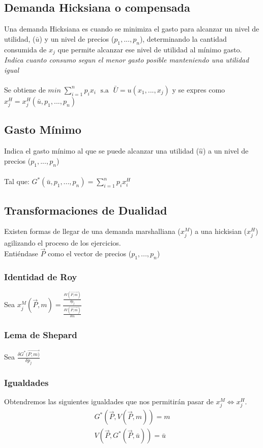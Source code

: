 \documentclass{article}
\begin{document}
\subsection{Demanda Hicksiana o compensada}
Una demanda Hicksiana es cuando se minimiza el gasto para alcanzar un nivel de utilidad, ($\bar{u}$) y un nivel de precios ($p_1,...,p_n$), determinando la cantidad consumida de $x_j$ que permite alcanzar ese nivel de utilidad al mínimo gasto. \\
\textit{Indica cuanto consumo segun el menor gasto posible manteniendo una utilidad igual}\\\\
Se obtiene de $min\; \sum_{i=1}^np_ix_i \;\text{ s.a }\; \bar{U}=u(x_1,...,x_j)$ y se expres como $x_j^H=x_j^H(\bar{u},p_1,...,p_n)$
\subsection{Gasto Mínimo}
Indica el gasto mínimo al que se puede alcanzar una utilidad ($\hat{u}$) a un nivel de precios ($p_1,...,p_n$)\\\\ 
Tal que: $G^*(\bar{u},p_1,...,p_n)=\sum_{i=1}^np_ix_i^H$\\ 
\subsection{Transformaciones de Dualidad}
Existen formas de llegar de una demanda marshalliana ($x_j^M$) a una hickisian ($x_j^H$) agilizando el proceso de los ejercicios. \\
Entiéndase $\vec{P}$ como el vector de precios ($p_1,...,p_n$)\\
\subsubsection{Identidad de Roy}
Sea $x_j^M(\vec{P},m)=\frac{\frac{\delta V(\vec{P,m})}{\delta p_j}}{\frac{\delta V(\vec{P,m})}{\delta m }}$\\
\subsubsection{Lema de Shepard}
Sea $\frac{\delta G^*(\vec{P,m)}}{\delta p_j}$
\subsubsection{Igualdades}
Obtendremos las siguientes igualdades que nos permitirán pasar de $x_j^M \iff x_j^H$. 
\begin{align*}
    G^*(\vec{P},V(\vec{P},m))=m\\
    V(\vec{P},G^*(\vec{P},\bar{u}))=\bar{u}\\\\
\end{align*}
\end{document}

